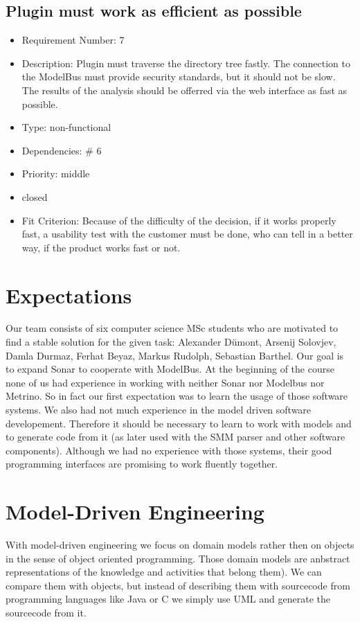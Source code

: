 \subsection{Plugin must work as efficient as possible}
\begin{itemize}
\item Requirement Number: 7
\item Description: Plugin must traverse the directory tree fastly. The connection to the ModelBus must provide security standards, but it should not be slow. The results of the analysis should be offerred via the web interface as fast as possible.
\item Type: non-functional
\item Dependencies: \# 6
\item Priority: middle
\item closed
\item Fit Criterion: Because of the difficulty of the decision, if it works properly fast, a usability test with the customer must be done, who can tell in a better way, if the product works fast or not.
\end{itemize}

\section{Expectations}
Our team consists of six computer science MSc students who are motivated to find a stable solution for the given task: Alexander Dümont, Arsenij Solovjev, Damla Durmaz, Ferhat Beyaz, Markus Rudolph, Sebastian Barthel.
Our goal is to expand Sonar to cooperate with ModelBus. At the beginning of the course none of us had experience in working with neither Sonar nor Modelbus nor Metrino. So in fact our first expectation was to learn the usage of those software systems. We also had not much experience in the model driven software developement. Therefore it should be necessary to learn to work with models and to generate code from it (as later used with the SMM parser and other software components). Although we had no experience with those systems, their good programming interfaces are promising to work fluently together.

\section{Model-Driven Engineering}
With model-driven engineering we focus on domain models rather then on objects in the sense of object oriented programming. Those domain models are anbstract representations of the knowledge and activities that belong them). We can compare them with objects, but instead of describing them with sourcecode from programming languages like Java or C we simply use UML and generate the sourcecode from it.


